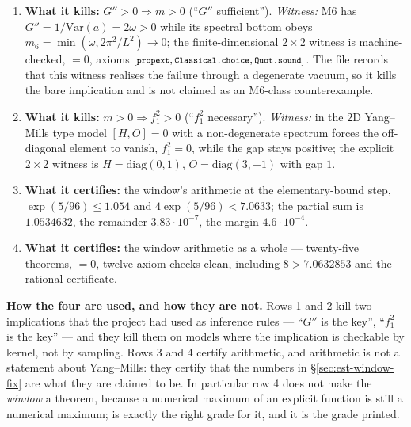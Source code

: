 \begin{enumerate}[label=\textbf{\arabic*.},leftmargin=2.0em]
\item \textbf{What it kills:} $G''>0\Rightarrow m>0$ (``$G''$ sufficient''). \emph{Witness:} M6 has
      $G''=1/\mathrm{Var}(a)=2\omega>0$ while its spectral bottom obeys
      $m_6=\min(\omega,2\pi^2/L^2)\to0$; the finite-dimensional $2\times2$ witness is
      machine-checked,  $=0$, axioms
      $[\code{propext},\code{Classical.choice},\code{Quot.sound}]$. The file records that this
      witness realises the failure through a degenerate vacuum, so it kills the bare implication and
      is not claimed as an M6-class counterexample.
      \begin{sloppypar}
      \noindent{}
      \end{sloppypar}
\item \textbf{What it kills:} $m>0\Rightarrow f_1^2>0$ (``$f_1^2$ necessary''). \emph{Witness:} in
      the $2$D Yang--Mills type model $[H,O]=0$ with a non-degenerate spectrum forces the
      off-diagonal element to vanish, $f_1^2=0$, while the gap stays positive; the explicit
      $2\times2$ witness is $H=\mathrm{diag}(0,1)$, $O=\mathrm{diag}(3,-1)$ with gap $1$.
\item \textbf{What it certifies:} the window's arithmetic at the elementary-bound step,
      $\exp(5/96)\le1.054$ and $4\exp(5/96)<7.0633$; the partial sum is $1.0534632$, the remainder
      $3.83\cdot10^{-7}$, the margin $4.6\cdot10^{-4}$.
\item \textbf{What it certifies:} the window arithmetic as a whole --- twenty-five theorems,
       $=0$, twelve axiom checks clean, including $8>7.0632853$ and the rational
      certificate. 
\end{enumerate}

\noindent\textbf{How the four are used, and how they are not.} Rows 1 and 2 kill two implications
that the project had used as inference rules --- ``$G''$ is the key'', ``$f_1^2$ is the key'' --- and
they kill them on models where the implication is checkable by kernel, not by sampling. Rows 3 and 4
certify arithmetic, and arithmetic is not a statement about Yang--Mills: they certify that the numbers
in \S\ref{sec:est-window-fix} are what they are claimed to be. In particular row 4 does not make the
\emph{window} a theorem, because a numerical maximum of an explicit function is still a numerical
maximum; \LM{} is exactly the right grade for it, and it is the grade printed.

